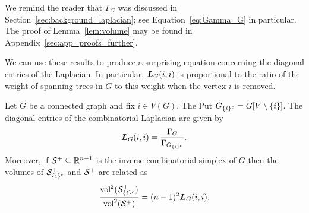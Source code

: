 We remind the reader that $\Gamma_G$ was discussed in  Section~\ref{sec:background_laplacian}; see  Equation~\eqref{eq:Gamma_G}  in particular. The proof of Lemma~\ref{lem:volume} may  be  found in Appendix~\ref{sec:app_proofs_further}.   


We can use these results to produce a surprising equation concerning  the diagonal entries of the Laplacian. In particular, $\vb*{L}_G(i,i)$ is proportional to the ratio of the weight of  spanning trees in $G$ to this weight when the vertex $i$ is removed. 

\begin{lemma}
	\label{lem:L(i,i)_trees}
	Let $G$ be a connected graph and fix $i\in V(G)$. 
	The Put $G_{\{i\}^c}=G[V\setminus \{i\}]$. The diagonal entries of the combinatorial Laplacian are given by 
	\begin{equation}
	\label{eq:L(i,i)_trees}
	\vb*{L}_G(i,i) = \frac{\Gamma_G}{\Gamma_{G_{\{i\}^c}}}.
	\end{equation}
	Moreover, if $\mathcal{S}^+\subseteq\mathbb{R}^{n-1}$  is the inverse combinatorial simplex of $G$ then the volumes
	of $\mathcal{S}^+_{\{i\}^c}$ and $\mathcal{S}^+$ are related as 
	\begin{equation}
	\label{eq:vol/vol}
	\frac{\textnormal{vol}^2(\mathcal{S}_{\{i\}^c}^+)}{\textnormal{vol}^2(\mathcal{S}^+)} = (n-1)^2\vb*{L}_G(i,i). 
	\end{equation}
\end{lemma}
